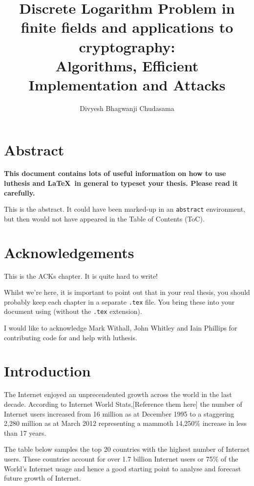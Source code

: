 \documentclass[iwp,first]{luthesis}
\title{\textsf{Discrete Logarithm Problem in finite fields and applications to cryptography:}
\\ \large{Algorithms, Efficient Implementation and Attacks}} %
\author{Divyesh Bhagwanji Chudasama} %
\begin{document}
\maketitle %

\frontmatter
\chapter{Abstract}

\textbf{This document contains lots of useful information on how to use \textsf{luthesis} and \LaTeX\ in general to typeset your thesis.  Please read it carefully.}

This is the abstract.  It could have been marked-up in an \verb|abstract| environment, but then would not have appeared in the Table of Contents (ToC).

\chapter{Acknowledgements}

This is the ACKs chapter.  It is quite hard to write!

Whilst we're here, it is important to point out that in your real thesis, you should probably keep each chapter in a separate \verb|.tex| file.  You bring these into your document using \verb|| (without the \verb|.tex| extension).

I would like to acknowledge Mark Withall, John Whitley and Iain Phillips for contributing code for and help with \textsf{luthesis}.

\tableofcontents
\listoffigures
\listoftables
\listoffixmes %

\mainmatter
\chapter{Introduction}

The Internet enjoyed an unprecendented growth across the world in the last decade. According to Internet World Stats,[Reference them here] the number of Internet users increased from 16 million as at December 1995 to a staggering 2,280 million as at March 2012 representing a mammoth 14,250\% increase in less than 17 years. 

The table below samples the top 20 countries with the highest number of Internet users. These countries account for over 1.7 billion Internet users or 75\% of the World's Internet usage and hence a good starting point to analyse and forecast future growth of Internet. 
\end{document}
